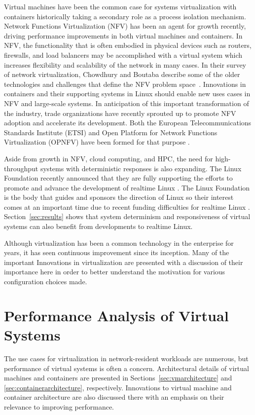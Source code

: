 Virtual machines have been the common case for systems virtualization with containers historically taking a secondary role as a process isolation mechanism.
Network Functions Virtualization (NFV) has been an agent for growth recently, driving performance improvements in both virtual machines and containers.
In NFV, the functionality that is often embodied in physical devices such as routers, firewalls, and load balancers may be accomplished with a virtual system which increases flexibility and scalability of the network in many cases.
In their survey of network virtualization, Chowdhury and Boutaba describe some of the older technologies and challenges that define the NFV problem space~\autocite{_chowdhury_1}.
Innovations in containers and their supporting systems in Linux should enable new uses cases in NFV and large-scale systems.
In anticipation of this important transformation of the industry, trade organizations have recently sprouted up to promote NFV adoption and accelerate its development.
Both the European Telecommunications Standards Institute (ETSI) and Open Platform for Network Functions Virtualization (OPNFV) have been formed for that purpose \autocite{opnfv1, cohnopnfv}.

Aside from growth in NFV, cloud computing, and HPC, the need for high-throughput systems with deterministic responses is also expanding.
The Linux Foundation recently announced that they are fully supporting the efforts to promote and advance the development of realtime Linux \autocite{_linux_foundation_1}.
The Linux Foundation is the body that guides and sponsors the direction of Linux so their interest comes at an important time due to recent funding difficulties for realtime Linux \autocite{_lwn_1}.
Section~\ref{sec:results} shows that system determinism and responsiveness of virtual systems can also benefit from developments to realtime Linux.

Although virtualization has been a common technology in the enterprise for years, it has seen continuous improvement since its inception.  
Many of the important Innovations in virtualization are presented with a discussion of their importance here in order to better understand the motivation for various configuration choices made.  


\section{Performance Analysis of Virtual Systems} %
\label{sec:introperformanceanalysis}
The use cases for virtualization in network-resident workloads are numerous, but performance of virtual systems is often a concern.
Architectural details of virtual machines and containers are presented in Sections~\ref{sec:vmarchitecture} and \ref{sec:containerarchitecture}, respectively.  
Innovations to virtual machine and container architecture are also discussed there with an emphasis on their relevance to improving performance.

